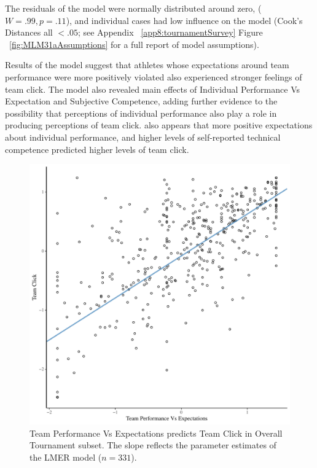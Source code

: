 \begin{CJK}{UTF8}{gbsn}
The residuals of the model were normally distributed around zero, ($W = .99, p = .11$), and individual cases had low influence on the model (Cook's Distances all $< .05$; see Appendix ~\ref{app8:tournamentSurvey} Figure ~\ref{fig:MLM31aAssumptions} for a full report of model assumptions).

Results of the model suggest that athletes whose expectations around team performance were more positively violated also experienced stronger feelings of team click.  The model also revealed main effects of Individual Performance Vs Expectation and Subjective Competence, adding further evidence to the possibility that perceptions of individual performance also play a role in producing perceptions of team click.   also appears that more positive expectations about individual performance, and higher levels of self-reported technical competence predicted higher levels of team click.


   \begin{figure}[htbp]
     \centering
   \includegraphics[scale=.5]{images/teamPerfClickOverallModelSlope.pdf}
     \caption{Team Performance Vs Expectations predicts Team Click in Overall Tournament subset.  The slope reflects the parameter estimates of the LMER model ($n = 331$).}
     \label{fig:teamPerfClickOverallModelSlope}
   \end{figure}




\end{CJK}
